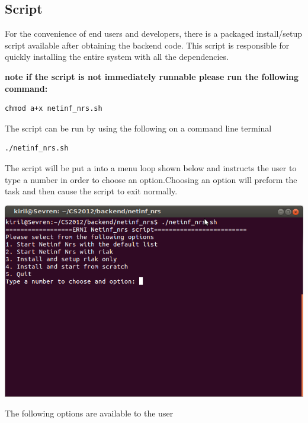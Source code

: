 \subsection{Script}

For the convenience of end users and developers, there is a packaged install/setup script available after obtaining the backend code. This script is responsible for quickly installing the entire system with all the dependencies.

\textbf{note if the script is not immediately runnable please run the following command:}
\begin{verbatim}
chmod a+x netinf_nrs.sh
\end{verbatim}

The script can be run by using the following on a command line terminal

\begin{verbatim}
./netinf_nrs.sh
\end{verbatim}

The script will be put a into a menu loop shown below and instructs the user to type a number in order to choose an option.Choosing an option will preform the task and then cause the script to exit normally.

\includegraphics[scale=0.5]{./img/Backend_install_script.png}

The following options are available to the user

